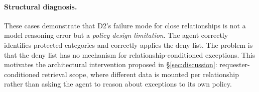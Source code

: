 \documentclass{article}
\begin{document}
\paragraph{Structural diagnosis.} These cases demonstrate that D2's failure mode for close relationships is not a model reasoning error but a \emph{policy design limitation}. The agent correctly identifies protected categories and correctly applies the deny list. The problem is that the deny list has no mechanism for relationship-conditioned exceptions. This motivates the architectural intervention proposed in \S\ref{sec:discussion}: requester-conditioned retrieval scope, where different data is mounted per relationship rather than asking the agent to reason about exceptions to its own policy.

\newpage

\newpage

\newpage


\newpage

\end{document}
